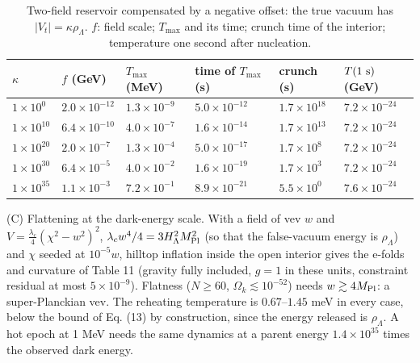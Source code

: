 \documentclass[11pt,a4paper]{article}
\begin{document}
\begin{table}[htbp]\centering\small
\caption{Two-field reservoir compensated by a negative offset: the true vacuum has $|V_t|=\kappa\rho_\Lambda$. $f$: field scale; $T_{\max}$ and its time; crunch time of the interior; temperature one second after nucleation.}
\begin{tabular}{llllll}
\toprule
$\kappa$ & $f$ (GeV) & $T_{\max}$ (MeV) & time of $T_{\max}$ (s) & crunch (s) & $T(1\ {\rm s})$ (GeV) \\ \midrule
$1\times10^{0}$ & $2.0\times10^{-12}$ & $1.3\times10^{-9}$ & $5.0\times10^{-12}$ & $1.7\times10^{18}$ & $7.2\times10^{-24}$ \\
$1\times10^{10}$ & $6.4\times10^{-10}$ & $4.0\times10^{-7}$ & $1.6\times10^{-14}$ & $1.7\times10^{13}$ & $7.2\times10^{-24}$ \\
$1\times10^{20}$ & $2.0\times10^{-7}$ & $1.3\times10^{-4}$ & $5.0\times10^{-17}$ & $1.7\times10^{8}$ & $7.2\times10^{-24}$ \\
$1\times10^{30}$ & $6.4\times10^{-5}$ & $4.0\times10^{-2}$ & $1.6\times10^{-19}$ & $1.7\times10^{3}$ & $7.2\times10^{-24}$ \\
$1\times10^{35}$ & $1.1\times10^{-3}$ & $7.2\times10^{-1}$ & $8.9\times10^{-21}$ & $5.5\times10^{0}$ & $7.6\times10^{-24}$ \\
\bottomrule
\end{tabular}
\end{table}
(C) Flattening at the dark-energy scale. With a field of vev $w$ and $V=\tfrac{\lambda_c}{4}(\chi^2-w^2)^2$, $\lambda_cw^4/4=3H_\Lambda^2M_{\rm Pl}^2$ (so that the false-vacuum energy is $\rho_\Lambda$) and $\chi$ seeded at $10^{-5}w$, hilltop inflation inside the open interior gives the e-folds and curvature of Table 11 (gravity fully included, $g=1$ in these units, constraint residual at most $5\times10^{-9}$). Flatness ($N\ge60$, $\Omega_k\lesssim10^{-52}$) needs $w\gtrsim4M_{\rm Pl}$: a super-Planckian vev. The reheating temperature is $0.67$--$1.45$ meV in every case, below the bound of Eq. (13) by construction, since the energy released is $\rho_\Lambda$. A hot epoch at 1 MeV needs the same dynamics at a parent energy $1.4\times10^{35}$ times the observed dark energy.
\end{document}
